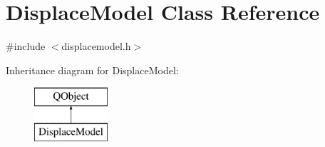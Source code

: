 \hypertarget{class_displace_model}{}\section{Displace\+Model Class Reference}
\label{class_displace_model}


{\ttfamily \#include $<$displacemodel.\+h$>$}

Inheritance diagram for Displace\+Model\+:\begin{figure}[H]
\begin{center}
\leavevmode
\includegraphics[height=2.000000cm]{d1/dbd/class_displace_model}
\end{center}
\end{figure}
